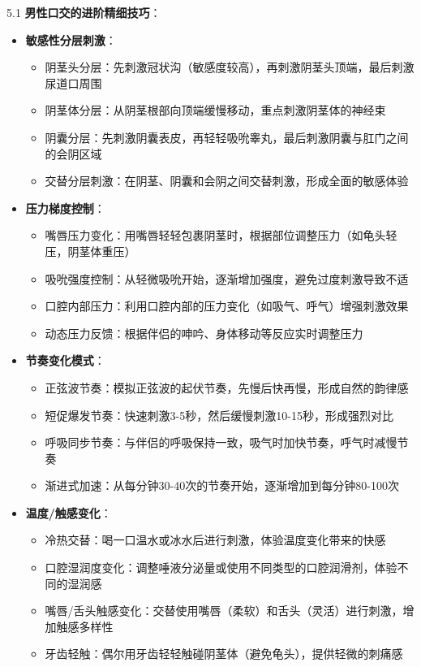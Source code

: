 \documentclass[12pt,UTF8]{ctexbook}
\begin{document}
5.1 \textbf{男性口交的进阶精细技巧}：
\begin{itemize}
	\item \textbf{敏感性分层刺激}：
	\begin{itemize}
		\item 阴茎头分层：先刺激冠状沟（敏感度较高），再刺激阴茎头顶端，最后刺激尿道口周围
		\item 阴茎体分层：从阴茎根部向顶端缓慢移动，重点刺激阴茎体的神经束
		\item 阴囊分层：先刺激阴囊表皮，再轻轻吸吮睾丸，最后刺激阴囊与肛门之间的会阴区域
		\item 交替分层刺激：在阴茎、阴囊和会阴之间交替刺激，形成全面的敏感体验
	\end{itemize}
	\item \textbf{压力梯度控制}：
	\begin{itemize}
		\item 嘴唇压力变化：用嘴唇轻轻包裹阴茎时，根据部位调整压力（如龟头轻压，阴茎体重压）
		\item 吸吮强度控制：从轻微吸吮开始，逐渐增加强度，避免过度刺激导致不适
		\item 口腔内部压力：利用口腔内部的压力变化（如吸气、呼气）增强刺激效果
		\item 动态压力反馈：根据伴侣的呻吟、身体移动等反应实时调整压力
	\end{itemize}
	\item \textbf{节奏变化模式}：
	\begin{itemize}
		\item 正弦波节奏：模拟正弦波的起伏节奏，先慢后快再慢，形成自然的韵律感
		\item 短促爆发节奏：快速刺激3-5秒，然后缓慢刺激10-15秒，形成强烈对比
		\item 呼吸同步节奏：与伴侣的呼吸保持一致，吸气时加快节奏，呼气时减慢节奏
		\item 渐进式加速：从每分钟30-40次的节奏开始，逐渐增加到每分钟80-100次
	\end{itemize}
	\item \textbf{温度/触感变化}：
	\begin{itemize}
		\item 冷热交替：喝一口温水或冰水后进行刺激，体验温度变化带来的快感
		\item 口腔湿润度变化：调整唾液分泌量或使用不同类型的口腔润滑剂，体验不同的湿润感
		\item 嘴唇/舌头触感变化：交替使用嘴唇（柔软）和舌头（灵活）进行刺激，增加触感多样性
		\item 牙齿轻触：偶尔用牙齿轻轻触碰阴茎体（避免龟头），提供轻微的刺痛感
	\end{itemize}
\end{itemize}
\end{document}

